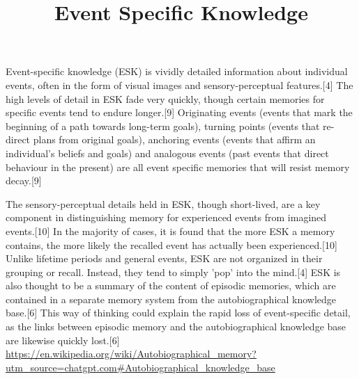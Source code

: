 \documentclass[a4paper]{article}
\title{Event Specific Knowledge}
\begin{document}
    \maketitle
    
    Event-specific knowledge (ESK) is vividly detailed information about individual events, often in the form of visual images and sensory-perceptual features.[4] The high levels of detail in ESK fade very quickly, though certain memories for specific events tend to endure longer.[9] Originating events (events that mark the beginning of a path towards long-term goals), turning points (events that re-direct plans from original goals), anchoring events (events that affirm an individual's beliefs and goals) and analogous events (past events that direct behaviour in the present) are all event specific memories that will resist memory decay.[9]
    
    The sensory-perceptual details held in ESK, though short-lived, are a key component in distinguishing memory for experienced events from imagined events.[10] In the majority of cases, it is found that the more ESK a memory contains, the more likely the recalled event has actually been experienced.[10] Unlike lifetime periods and general events, ESK are not organized in their grouping or recall. Instead, they tend to simply 'pop' into the mind.[4] ESK is also thought to be a summary of the content of episodic memories, which are contained in a separate memory system from the autobiographical knowledge base.[6] This way of thinking could explain the rapid loss of event-specific detail, as the links between episodic memory and the autobiographical knowledge base are likewise quickly lost.[6]
    \url{https://en.wikipedia.org/wiki/Autobiographical_memory?utm_source=chatgpt.com#Autobiographical_knowledge_base}
\end{document}
